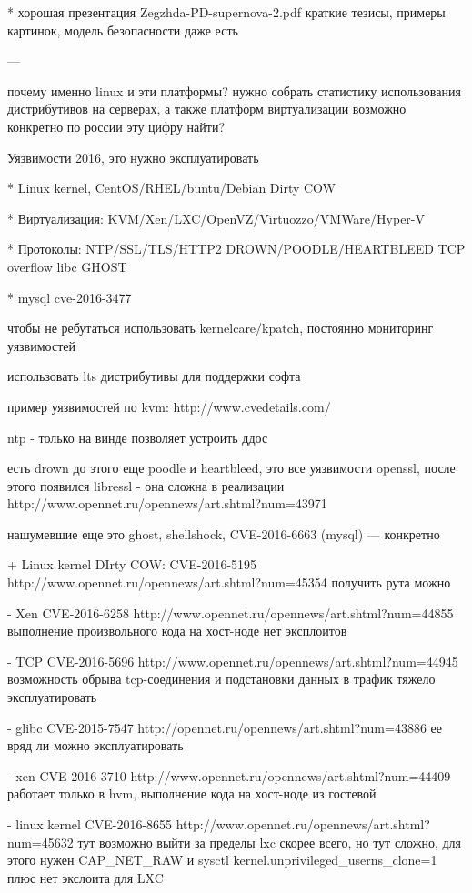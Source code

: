 * хорошая презентация Zegzhda-PD-supernova-2.pdf краткие тезисы, примеры картинок, модель безопасности даже есть

---


почему именно linux и эти платформы?
нужно собрать статистику использования дистрибутивов на серверах, а также платформ виртуализации
возможно конкретно по россии эту цифру найти?

Уязвимости 2016, это нужно эксплуатировать

* Linux kernel, CentOS/RHEL/buntu/Debian Dirty COW

* Виртуализация: KVM/Xen/LXC/OpenVZ/Virtuozzo/VMWare/Hyper-V

* Протоколы: NTP/SSL/TLS/HTTP2 DROWN/POODLE/HEARTBLEED TCP overflow libc GHOST

* mysql cve-2016-3477

чтобы не ребутаться использовать kernelcare/kpatch, постоянно мониторинг уязвимостей

использовать lts дистрибутивы для поддержки софта

пример уязвимостей по kvm: http://www.cvedetails.com/

ntp - только на винде позволяет устроить ддос

есть drown до этого еще poodle и heartbleed, это все уязвимости openssl, после этого появился libressl - она сложна в реализации http://www.opennet.ru/opennews/art.shtml?num=43971

нашумевшие еще это ghost, shellshock, CVE-2016-6663 (mysql)
--- конкретно

+ Linux kernel DIrty COW: CVE-2016-5195 http://www.opennet.ru/opennews/art.shtml?num=45354
получить рута можно

- Xen CVE-2016-6258 http://www.opennet.ru/opennews/art.shtml?num=44855
выполнение произвольного кода на хост-ноде
нет эксплоитов

- TCP CVE-2016-5696 http://www.opennet.ru/opennews/art.shtml?num=44945
возможность обрыва tcp-соединения и подстановки данных в трафик
тяжело эксплуатировать

- glibc CVE-2015-7547 http://opennet.ru/opennews/art.shtml?num=43886
ее вряд ли можно эксплуатировать

- xen CVE-2016-3710 http://www.opennet.ru/opennews/art.shtml?num=44409
работает только в hvm, выполнение кода на хост-ноде из гостевой

- linux kernel CVE-2016-8655 http://www.opennet.ru/opennews/art.shtml?num=45632
тут возможно выйти за пределы lxc скорее всего, но тут сложно, для этого нужен CAP\_NET\_RAW и sysctl kernel.unprivileged\_userns\_clone=1 плюс нет экслоита для LXC

